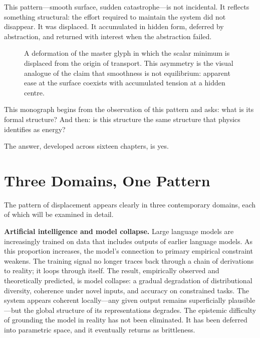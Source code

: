 \documentclass[12pt,a4paper,openany]{book}
\theoremstyle{plain}
\theoremstyle{definition}
\theoremstyle{remark}
\newcommand{\RSVPFlowRing}[3]{%
  \foreach \ang in {0,45,...,315}{%
    \draw[rsvp flow]
      ({#1 + #3*cos(\ang)},{#2 + #3*sin(\ang)})
      -- ++({-0.35*sin(\ang)},{0.35*cos(\ang)});}}
\newcommand{\RSVPEntropyRays}[3]{%
  \foreach \ang in {0,60,...,300}{%
    \draw[rsvp entropy]
      (#1,#2) -- ({#1 + #3*cos(\ang)},{#2 + #3*sin(\ang)});}}
\begin{document}
This pattern---smooth surface, sudden catastrophe---is not incidental. It reflects something structural: the effort required to maintain the system did not disappear. It was displaced. It accumulated in hidden form, deferred by abstraction, and returned with interest when the abstraction failed.

\begin{figure}[h]
\centering
{}
\caption[Asymmetric glyph, Chapter~1]{A deformation of the master glyph in which the scalar minimum is displaced from the origin of transport. This asymmetry is the visual analogue of the claim that smoothness is not equilibrium: apparent ease at the surface coexists with accumulated tension at a hidden centre.}
\label{fig:glyph_asymmetric}
\end{figure}

This monograph begins from the observation of this pattern and asks: what is its formal structure? And then: is this structure the same structure that physics identifies as energy?

The answer, developed across sixteen chapters, is yes.

\section{Three Domains, One Pattern}

The pattern of displacement appears clearly in three contemporary domains, each of which will be examined in detail.

\textbf{Artificial intelligence and model collapse.} Large language models are increasingly trained on data that includes outputs of earlier language models. As this proportion increases, the model's connection to primary empirical constraint weakens. The training signal no longer traces back through a chain of derivations to reality; it loops through itself. The result, empirically observed and theoretically predicted, is model collapse: a gradual degradation of distributional diversity, coherence under novel inputs, and accuracy on constrained tasks. The system appears coherent locally---any given output remains superficially plausible---but the global structure of its representations degrades. The epistemic difficulty of grounding the model in reality has not been eliminated. It has been deferred into parametric space, and it eventually returns as brittleness.
\end{document}
